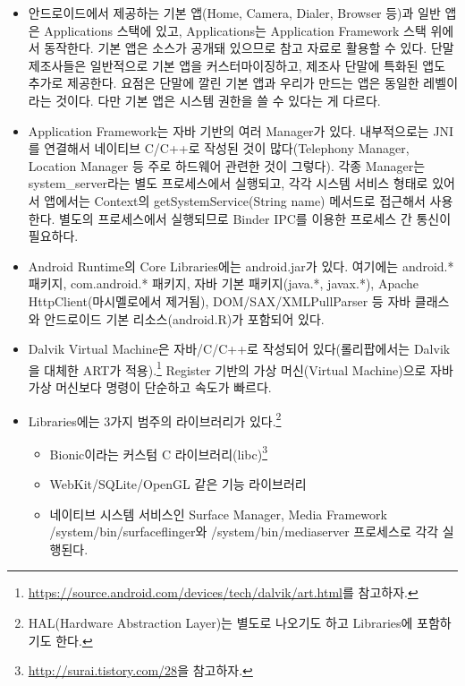 \begin{itemize}
\item 안드로이드에서 제공하는 기본 앱(Home, Camera, Dialer, Browser 등)과 일반 앱은 Applications 스택에 있고, Applications는 Application Framework 스택 위에서 동작한다. 기본 앱은 소스가 공개돼 있으므로 참고 자료로 활용할 수 있다. 단말 제조사들은 일반적으로 기본 앱을 커스터마이징하고, 제조사 단말에 특화된 앱도 추가로 제공한다. 요점은 단말에 깔린 기본 앱과 우리가 만드는 앱은 동일한 레벨이라는 것이다. 다만 기본 앱은 시스템 권한을 쓸 수 있다는 게 다르다.

\item Application Framework는 자바 기반의 여러 Manager가 있다. 내부적으로는 JNI를 연결해서 네이티브 C/C++로 작성된 것이 많다(Telephony Manager, Location Manager 등 주로 하드웨어 관련한 것이 그렇다). 각종 Manager는 system\_server라는 별도 프로세스에서 실행되고, 각각 시스템 서비스 형태로 있어서 앱에서는 Context의 getSystemService(String name) 메서드로 접근해서 사용한다. 별도의 프로세스에서 실행되므로 Binder IPC를 이용한 프로세스 간 통신이 필요하다.

\item Android Runtime의 Core Libraries에는 android.jar가 있다. 여기에는 android.* 패키지, com.android.* 패키지, 자바 기본 패키지(java.*, javax.*), Apache HttpClient(마시멜로에서 제거됨), DOM/SAX/XM\-LPullParser 등 자바 클래스와 안드로이드 기본 리소스(android.R)가 포함되어 있다.

\item Dalvik Virtual Machine은 자바/C/C++로 작성되어 있다(롤리팝에서는 Dalvik을 대체한 ART가 적용).\footnote{\url{https://source.android.com/devices/tech/dalvik/art.html}를 참고하자.} Register 기반의 가상 머신(Virtual Machine)으로 자바 가상 머신보다 명령이 단순하고 속도가 빠르다.

\item Libraries에는 3가지 범주의 라이브러리가 있다.\footnote{HAL(Hardware Abstraction Layer)는 별도로 나오기도 하고 Libraries에 포함하기도 한다.}
\begin{itemize}
\item Bionic이라는 커스텀 C 라이브러리(libc)\footnote{\url{http://surai.tistory.com/28}을 참고하자.}
\item WebKit/SQLite/OpenGL 같은 기능 라이브러리
\item 네이티브 시스템 서비스인 Surface Manager, Media Framework\\
/system/bin/surfaceflinger와 /system/bin/mediaserver 프로세스로 각각 실행된다.
\end{itemize}


\end{itemize}
